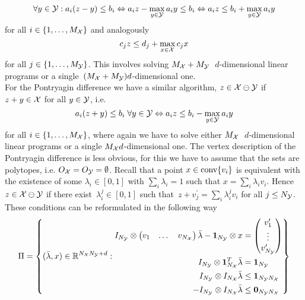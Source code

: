 %
\begin{equation}
	\forall y\in\mathcal Y: a_i(z-y)\leq b_i \Leftrightarrow a_iz-\max_{y\in\mathcal Y}a_iy\leq b_i \Leftrightarrow a_iz \leq b_i+\max_{y\in\mathcal Y}a_iy
\end{equation}
%
for all $i\in\{1,\dots,M_\mathcal X\}$ and analogously
%
\begin{equation}
	c_j z\leq d_j + \max_{x\in\mathcal X}c_jx
\end{equation}
%
for all $j\in\{1,\dots,M_\mathcal Y\}$. 
%
This involves solving $M_\mathcal X+M_\mathcal Y\;$ $d$-dimensional linear programs or a single~$(M_\mathcal X+M_\mathcal Y)d$-dimensional one.
%
\\[1em]
%
\mysplit For the Pontryagin difference we have a similar algorithm, $z\in\mathcal X\ominus\mathcal Y$ if $z+y\in\mathcal X$ for all $y\in\mathcal Y$, i.e.
%
\begin{equation}
	a_i(z+y)\leq b_i\;\forall y\in\mathcal Y \Leftrightarrow a_iz\leq b_i-\max_{y\in\mathcal Y}a_iy
\end{equation}
%
for all $i\in\{1,\dots, M_\mathcal X\}$, where again we have to solve either $M_\mathcal X\;$ $d$-dimensional linear programs or a single $M_\mathcal X d$-dimensional one.
%
The vertex description of the Pontryagin difference is less obvious, for this we have to assume that the sets are polytopes, i.e. $O_\mathcal X=O_\mathcal Y=\emptyset$.
%
Recall that a point $x\in\text{conv}\{v_i\}$ is equivalent with the existence of some $\lambda_i\in[0,1]$ with $\sum_i\lambda_i=1$ such that $x=\sum_i\lambda_i v_i$.
%
Hence $z\in\mathcal X\ominus\mathcal Y$ if there exist~$\lambda_i^j\in[0,1]$ such that~$z+v_j^\prime = \sum_i\lambda_i^j v_i$ for all $j\leq N_\mathcal Y$.
%
These conditions can be reformulated in the following way
%
\begin{equation}
\Pi = \left\{(\bar\lambda,x)\in\mathbb R^{N_\mathcal X N_\mathcal Y+d}:\begin{aligned}
I_{N_\mathcal Y}\otimes\begin{pmatrix}v_1&\dots&v_{N_\mathcal X}\end{pmatrix}\bar{\lambda} -\mathbf{1}_{N_\mathcal Y}\otimes x &= \begin{pmatrix}v_1^\prime\\\vdots\\v_{N_\mathcal Y}^\prime\end{pmatrix}\\
I_{N_\mathcal Y}\otimes\mathbf{1}^T_{N_\mathcal X}\bar{\lambda} &= \mathbf{1}_{N_\mathcal Y}\\
I_{N_\mathcal Y}\otimes I_{N_\mathcal X}\bar\lambda&\leq\mathbf{1}_{N_\mathcal Y N_\mathcal X}\\
-I_{N_\mathcal Y}\otimes I_{N_\mathcal X}\bar\lambda&\leq\mathbf{0}_{N_\mathcal Y N_\mathcal X}
\end{aligned}\right\}
\end{equation}

